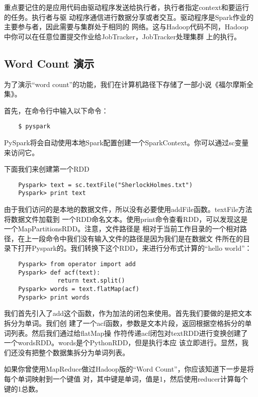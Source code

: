 重点要记住的是应用代码由驱动程序发送给执行者，执行者指定context和要运行的任务。执行者与驱
动程序通信进行数据分享或者交互。驱动程序是Spark作业的主要参与者，因此需要与集群处于相同的
网络。这与Hadoop代码不同，Hadoop中你可以在任意位置提交作业给JobTracker，JobTracker处理集群
上的执行。

\subsection{Word Count 演示}\label{word-count-ux6f14ux793a}

为了演示“word
count”的功能，我们在计算机路径下存储了一部小说《福尔摩斯全集》。

首先，在命令行中输入以下命令：

\begin{lstlisting}
	$ pyspark
\end{lstlisting}

PySpark将会自动使用本地Spark配置创建一个SparkContext。你可以通过sc变量来访问它。

下面我们来创建第一个RDD

\begin{lstlisting}
	Pyspark> text = sc.textFile("SherlockHolmes.txt")
	Pyspark> print text
\end{lstlisting}

由于我们访问的是本地的数据文件，所以没有必要使用addFile函数。textFile方法将数据文件加载到
一个RDD命名文本。使用print命令查看RDD，可以发现这是一个MapPartitionsRDD。注意，文件路径是
相对于当前工作目录的一个相对路径，在上一段命令中我们没有输入文件的路径是因为我们是在数据文
件所在的目录下打开Pyspark的。我们转换下这个RDD，来进行分布式计算的“hello
world”：

\begin{lstlisting}
	Pyspark> from operator import add
	Pyspark> def acf(text):
		       return text.split()
	Pyspark> words = text.flatMap(acf)
	Pyspark> print words
\end{lstlisting}

我们首先引入了add这个函数，作为加法的闭包来使用。首先我们要做的是把文本拆分为单词。我们创
建了一个acf函数，参数是文本片段，返回根据空格拆分的单词列表。然后我们通过给flatMap操
作符传递acf闭包对textRDD进行变换创建了一个wordsRDD。words是个PythonRDD，但是执行本应
该立即进行。显然，我们还没有把整个数据集拆分为单词列表。

如果你曾使用MapReduce做过Hadoop版的“Word Count”，你应该知道下一步是将每个单词映射到一个键值
对，其中键是单词，值是1，然后使用reducer计算每个键的1总数。

